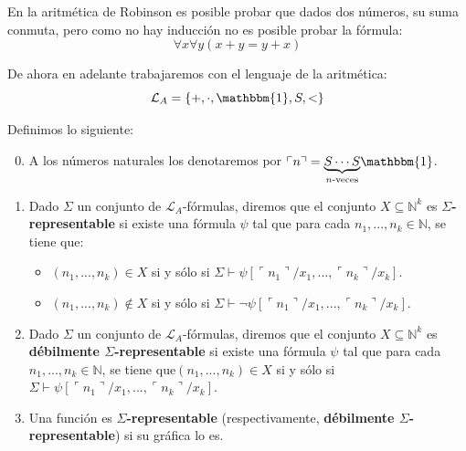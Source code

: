 \documentclass[12pt]{report}
\newcounter{it}
\theoremstyle{largebreak}
\newcommand{\bbm}[1]{\ensuremath{\mathbbm{#1}}}
\begin{document}
    En la aritmética de Robinson es posible probar que dados dos números, su suma conmuta, pero como no hay inducción no es posible probar la fórmula:
    \begin{equation*}
        \forall x\forall y(x+y=y+x)
    \end{equation*}

    De ahora en adelante trabajaremos con el lenguaje de la aritmética:
    \begin{equation*}
        \mathcal{L}_A=\left\{+,\cdot,\bbm{1},S,< \right\}
    \end{equation*}

    \newcommand{\winecomma}[1]{\ensuremath{\ulcorner#1\urcorner}}

    \begin{mydef}
        Definimos lo siguiente:
        \begin{enumerate}[label = \textit{(\arabic*)}]
            \setcounter{enumi}{-1}
            \item A los números naturales los denotaremos por $\winecomma{n}=\underset{n\textup{-veces}}{\underbrace{S\cdots S}}\bbm{1}$.
            \item Dado $\Sigma$ un conjunto de $\mathcal{L}_A$-fórmulas, diremos que el conjunto $X\subseteq\mathbb{N}^k$ es \textbf{$\Sigma$-representable} si existe una fórmula $\psi$ tal que para cada $n_1,...,n_k\in\mathbb{N}$, se tiene que:
            \begin{itemize}
                \item $(n_1,...,n_k)\in X$ si y sólo si $\Sigma\vdash\psi\left[\winecomma{n_1}/x_1,...,\winecomma{n_k}/x_k\right]$.
                \item $(n_1,...,n_k)\notin X$ si y sólo si $\Sigma\vdash\neg\psi\left[\winecomma{n_1}/x_1,...,\winecomma{n_k}/x_k\right]$.
            \end{itemize}
            \item Dado $\Sigma$ un conjunto de $\mathcal{L}_A$-fórmulas, diremos que el conjunto $X\subseteq\mathbb{N}^k$ es \textbf{débilmente $\Sigma$-representable} si existe una fórmula $\psi$ tal que para cada $n_1,...,n_k\in\mathbb{N}$, se tiene que$(n_1,...,n_k)\in X$ si y sólo si $\Sigma\vdash\psi\left[\winecomma{n_1}/x_1,...,\winecomma{n_k}/x_k\right]$.
            \item Una función es \textbf{$\Sigma$-representable} (respectivamente, \textbf{débilmente $\Sigma$-representable}) si su gráfica lo es.
        \end{enumerate}
    \end{mydef}
\end{document}
